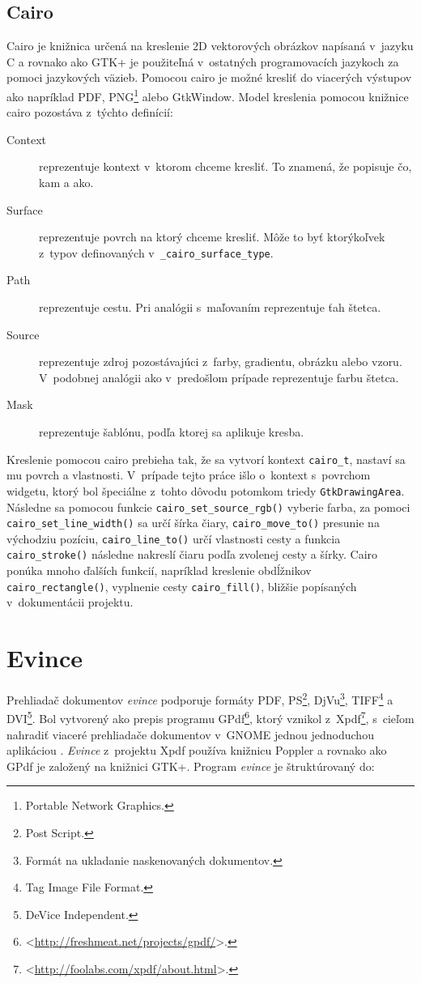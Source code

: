 \documentclass[12pt,oneside,final]{fithesis2}
\begin{document}
\section{Cairo}
Cairo je knižnica určená na kreslenie 2D vektorových obrázkov napísaná v~jazyku C a rovnako ako GTK+ je použiteľná v~ostatných programovacích jazykoch za pomoci jazykových väzieb. Pomocou cairo je možné kresliť do viacerých výstupov ako napríklad PDF, PNG\footnote{Portable Network Graphics.} alebo GtkWindow. Model kreslenia pomocou knižnice cairo pozostáva z~týchto definícií:
\begin{description}
\item[Context] reprezentuje kontext v~ktorom chceme kresliť. To znamená, že popisuje čo, kam a ako.
\item[Surface] reprezentuje povrch na ktorý chceme kresliť. Môže to byť ktorýkoľvek z~typov definovaných v~\texttt{\_\-cairo\_\-surface\_\-type}.
\item[Path] reprezentuje cestu. Pri analógii s~maľovaním reprezentuje ťah štetca.
\item[Source] reprezentuje zdroj pozostávajúci z~farby, gradientu, obrázku alebo vzoru. V~podobnej analógii ako v~predošlom prípade reprezentuje farbu štetca.
\item[Mask] reprezentuje šablónu, podľa ktorej sa aplikuje kresba.
\end{description}
Kreslenie pomocou cairo prebieha tak, že sa vytvorí kontext \texttt{cairo\_\-t}, nastaví sa mu povrch a vlastnosti. V~prípade tejto práce išlo o~kontext s~povrchom widgetu, ktorý bol špeciálne z~tohto dôvodu potomkom triedy \texttt{GtkDrawingArea}. Následne sa pomocou funkcie \texttt{cairo\_\-set\_\-source\_\-rgb()} vyberie farba, za pomoci \texttt{cairo\_\-set\_\-line\_\-width()} sa určí šírka čiary, \texttt{cairo\_\-move\_\-to()} presunie na východziu pozíciu, \texttt{cairo\_\-line\_\-to()} určí vlastnosti cesty a funkcia \texttt{cairo\_\-stroke()} následne nakreslí čiaru podľa zvolenej cesty a šírky. Cairo ponúka mnoho ďalších funkcií, napríklad kreslenie obdĺžnikov \texttt{cairo\_\-rectangle()}, vyplnenie cesty \texttt{cairo\_\-fill()}, bližšie popísaných v~dokumentácii projektu\cite{cairodoc}.
\chapter{Evince}
Prehliadač dokumentov \emph{evince} podporuje formáty PDF, PS\footnote{Post Script.}, DjVu\footnote{Formát na ukladanie naskenovaných dokumentov.}, TIFF\footnote{Tag Image File Format.} a DVI\footnote{DeVice Independent.}. Bol vytvorený ako prepis programu GPdf\footnote{<\url{http://freshmeat.net/projects/gpdf/}>.}, ktorý vznikol z~Xpdf\footnote{<\url{http://foolabs.com/xpdf/about.html}>.}, s~cieľom nahradiť viaceré prehliadače dokumentov v~GNOME jednou jednoduchou aplikáciou \cite{evince}. \emph{Evince} z~projektu Xpdf používa knižnicu Poppler a rovnako ako GPdf je založený na knižnici GTK+. Program \emph{evince} je štruktúrovaný do:
\end{document}
